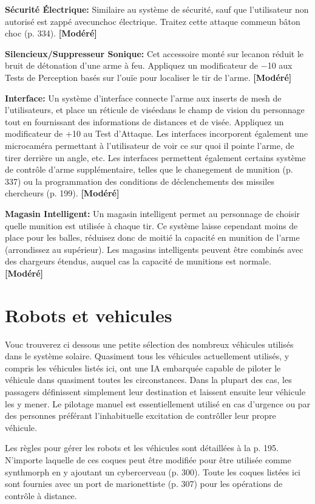 \textbf{Sécurité Électrique:} Similaire au système de sécurité, sauf que l'utilisateur non autorisé est zappé avecunchoc électrique. Traitez cette attaque commeun bâton choc (p. 334). \textbf{[Modéré]} 

\textbf{Silencieux/Suppresseur Sonique:} Cet accessoire monté sur lecanon réduit le bruit de détonation d'une arme à feu. Appliquez un modificateur de $-$10 aux Tests de Perception basés sur l'ouïe pour localiser le tir de l'arme. \textbf{[Modéré]} 

\textbf{Interface:} Un système d'interface connecte l'arme aux inserts de mesh de l'utilisateurs, et place un réticule de viséedans le champ de vision du personnage tout en fournissant des informations de distances et de visée. Appliquez un modificateur de +10 au Test d'Attaque. Les interfaces incorporent également une microcaméra permettant à l'utilisateur de voir ce sur quoi il pointe l'arme, de tirer derrière un angle, etc. Les interfaces permettent également certains système de contrôle d'arme supplémentaire, telles que le chanegement de munition (p. 337) ou la programmation des conditions de déclenchements des missiles chercheurs (p. 199). \textbf{[Modéré]} 

\textbf{Magasin Intelligent:} Un magasin intelligent permet au personnage de choisir quelle munition est utilisée à chaque tir. Ce système laisse cependant moins de place pour les balles, réduisez donc de moitié la capacité en munition de l'arme (arrondissez au supérieur). Les magasins intelligents peuvent être combinés avec des chargeurs étendus, auquel cas la capacité de munitions est normale. \textbf{[Modéré]} 

\section{Robots et vehicules} \label{sec:robots-vehicles} 

Vouc trouverez ci dessous une petite sélection des nombreux véhicules utilisés dans le système solaire. Quasiment tous les véhicules actuellement utilisés, y compris les véhicules listés ici, ont une IA embarquée capable de piloter le véhicule dans quasiment toutes les circonstances. Dans la plupart des cas, les passagers définissent simplement leur destination et laissent ensuite leur véhicule les y mener. Le pilotage manuel est essentiellement utilisé en cas d'urgence ou par des personnes préférant l'inhabituelle excitation de contrôller leur propre véhicule. 

Les règles pour gérer les robots et les véhicules sont détaillées à la p. 195. N'importe laquelle de ces coques peut être modifiée pour être utilisée comme synthmorph en y ajoutant un cybercerveau (p. 300). Toute les coques listées ici sont fournies avec un port de marionettiste (p. 307) pour les opérations de contrôle à distance. 

